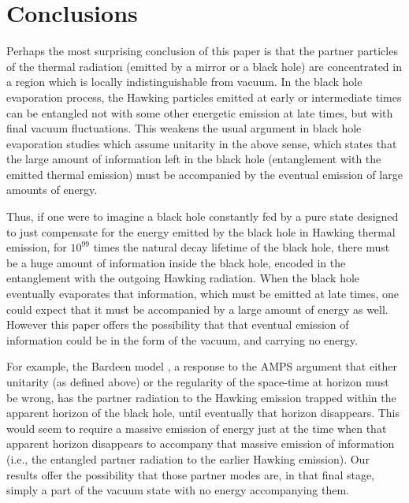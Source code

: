 \documentclass[aps,prd,showpacs,amssymb,nofootinbib,12pt]{revtex4-2}
\begin{document}


\section{Conclusions}

Perhaps the most surprising conclusion of this paper is that the partner 
particles of the thermal radiation (emitted by a mirror or a black hole) 
are concentrated in a region which is locally indistinguishable from vacuum.
%
In the black hole evaporation process, the Hawking particles emitted at 
early or intermediate times can be entangled not with some other energetic 
emission at late times, but with final vacuum fluctuations. 
%
This weakens the usual argument in black hole evaporation studies which assume 
unitarity in the above sense, which states that the large amount of 
information left in the black hole 
(entanglement with the emitted thermal emission) must be accompanied 
by the eventual emission of large amounts of energy.

Thus, if one were to imagine a black hole constantly fed by a pure state 
designed to just compensate for the energy emitted by the black hole in 
Hawking thermal emission, for $10^{99}$ times the natural decay lifetime 
of the black hole, there must be a huge amount of information inside the 
black hole, encoded in the entanglement with the outgoing Hawking radiation. 
%
When the black hole eventually evaporates that information, which must be 
emitted at late times, one could expect that it must be accompanied by a 
large amount of energy as well. 
%
However this paper offers the possibility that that eventual emission of 
information could be in the form of the vacuum, and carrying no energy. 

For example, the Bardeen model \cite{bardeen}, a response to the 
AMPS \cite{amps} argument that either unitarity (as defined above) 
or the regularity of the space-time at horizon must be wrong, has the partner 
radiation to the Hawking emission trapped within the apparent horizon of the 
black hole, until eventually that horizon disappears. 
%
This would seem to require a massive emission of energy just at the time when 
that apparent horizon disappears to accompany that massive emission of 
information (i.e., the entangled partner radiation to the earlier Hawking 
emission). 
%
Our results offer the possibility that those partner modes are, in that final 
stage, simply a part of the vacuum state with no energy accompanying them.
\end{document}
